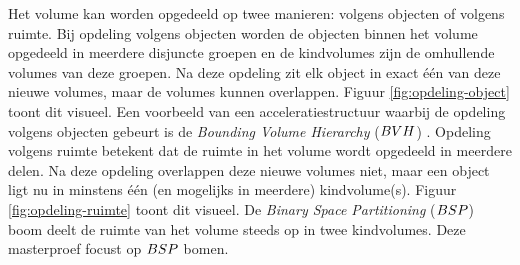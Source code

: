 Het volume kan worden opgedeeld op twee manieren: volgens objecten of volgens ruimte.
Bij opdeling volgens objecten worden de objecten binnen het volume opgedeeld in meerdere disjuncte groepen en de kindvolumes zijn de omhullende volumes van deze groepen.
Na deze opdeling zit elk object in exact één van deze nieuwe volumes, maar de volumes kunnen overlappen.
Figuur \ref{fig:opdeling-object} toont dit visueel.
Een voorbeeld van een acceleratiestructuur waarbij de opdeling volgens objecten gebeurt is de \textit{Bounding Volume Hierarchy} ($BVH$) \cite{goldsmith1987automatic}.
Opdeling volgens ruimte betekent dat de ruimte in het volume wordt opgedeeld in meerdere delen.
Na deze opdeling overlappen deze nieuwe volumes niet, maar een object ligt nu in minstens één (en mogelijks in meerdere) kindvolume(s).
Figuur \ref{fig:opdeling-ruimte} toont dit visueel.
De \textit{Binary Space Partitioning} ($BSP$) boom deelt de ruimte van het volume steeds op in twee kindvolumes.
Deze masterproef focust op $BSP$ bomen.

